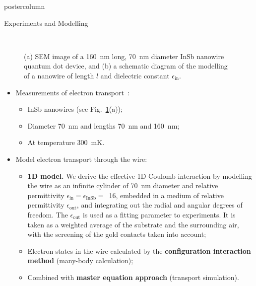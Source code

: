 \documentclass[final,hyperref={pdfpagelabels=true},notheorems]{beamer}
\begin{document}
\begin{frame}
\begin{columns}
\begin{column}{.32\textwidth}
\begin{beamercolorbox}[center,wd=\textwidth]{postercolumn}
\begin{minipage}[T]{.95\textwidth}
{\begin{block}{Experiments and Modelling\phantom{Gg}}
\begin{figure}
{                }
                \\[1em]
                \caption{(a) SEM image of a 160~nm long, 70~nm diameter InSb nanowire quantum dot device, and (b) a schematic diagram of the modelling of a nanowire of length $l$ and dielectric constant $\epsilon_\text{in}$.}
                \label{fig:wire}
              \end{figure}
              \begin{itemize}
                \item Measurements of electron transport~\cite{NilssonNL2009}:
                \begin{itemize}
                  \item InSb nanowires (see Fig.~\ref{fig:wire}(a));
                  \item Diameter 70~nm and lengths 70~nm and 160~nm;
                  \item At temperature 300~mK.
                \end{itemize}
                \item Model electron transport through the wire:
                \begin{itemize}
                  \item \textbf{1D model.} We derive the effective 1D Coulomb interaction by modelling the wire as an infinite cylinder of 70~nm diameter and relative permittivity $\epsilon_\text{in}=\epsilon_\text{InSb}=$~16, embedded in a medium of relative permittivity $\epsilon_\text{out}$, and integrating out the radial and angular degrees of freedom. The $\epsilon_\text{out}$ is used as a fitting parameter to experiments. It is taken as a weighted average of the substrate and the surrounding air, with the screening of the gold contacts taken into account;
                  \item Electron states in the wire calculated by the \textbf{configuration interaction method} (many-body calculation);
                  \item Combined with \textbf{master equation approach} (transport simulation). %
                \end{itemize}
              \end{itemize}
            \end{block}
          }
        \end{minipage}
      \end{beamercolorbox}
    \end{column}



\end{columns}
\end{frame}
\end{document}
